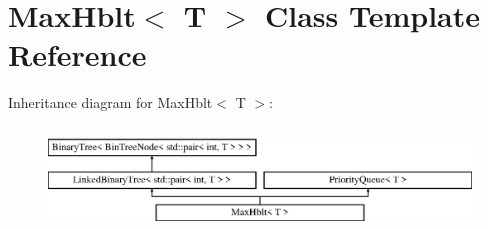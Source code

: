 \hypertarget{classMaxHblt}{}\section{Max\+Hblt$<$ T $>$ Class Template Reference}
\label{classMaxHblt}
Inheritance diagram for Max\+Hblt$<$ T $>$\+:\begin{figure}[H]
\begin{center}
\leavevmode
\includegraphics[height=2.781457cm]{classMaxHblt}
\end{center}
\end{figure}
